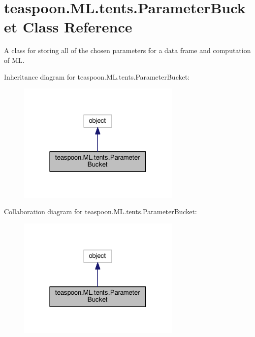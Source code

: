 \hypertarget{classteaspoon_1_1_m_l_1_1tents_1_1_parameter_bucket}{}\section{teaspoon.\+M\+L.\+tents.\+Parameter\+Bucket Class Reference}
\label{classteaspoon_1_1_m_l_1_1tents_1_1_parameter_bucket}


A class for storing all of the chosen parameters for a data frame and computation of ML.  




Inheritance diagram for teaspoon.\+M\+L.\+tents.\+Parameter\+Bucket\+:\nopagebreak
\begin{figure}[H]
\begin{center}
\leavevmode
\includegraphics[width=226pt]{classteaspoon_1_1_m_l_1_1tents_1_1_parameter_bucket__inherit__graph}
\end{center}
\end{figure}


Collaboration diagram for teaspoon.\+M\+L.\+tents.\+Parameter\+Bucket\+:\nopagebreak
\begin{figure}[H]
\begin{center}
\leavevmode
\includegraphics[width=226pt]{classteaspoon_1_1_m_l_1_1tents_1_1_parameter_bucket__coll__graph}
\end{center}
\end{figure}
